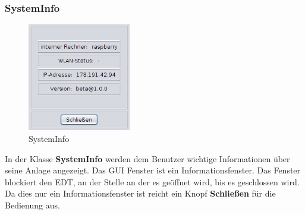 \subsubsection{SystemInfo}
\begin{figure}
\vspace{-20pt}
  \begin{center}
    \includegraphics[width=0.40\textwidth]{Bilder/GUI/SystemInfo}
  \end{center}
  \caption{SystemInfo}
  \label{SystemInfo}
  \vspace{-60pt}
\end{figure}
   
In der Klasse \textbf{SystemInfo} werden dem Benutzer wichtige Informationen über seine Anlage angezeigt. Das \ac{GUI} Fenster ist ein Informationsfenster. Das Fenster blockiert den \ac{EDT}, an der Stelle an der es geöffnet wird, bis es geschlossen wird. Da dies nur ein Informationsfenster ist reicht ein Knopf \textbf{Schließen} für die Bedienung aus.

\vspace{10pt}


